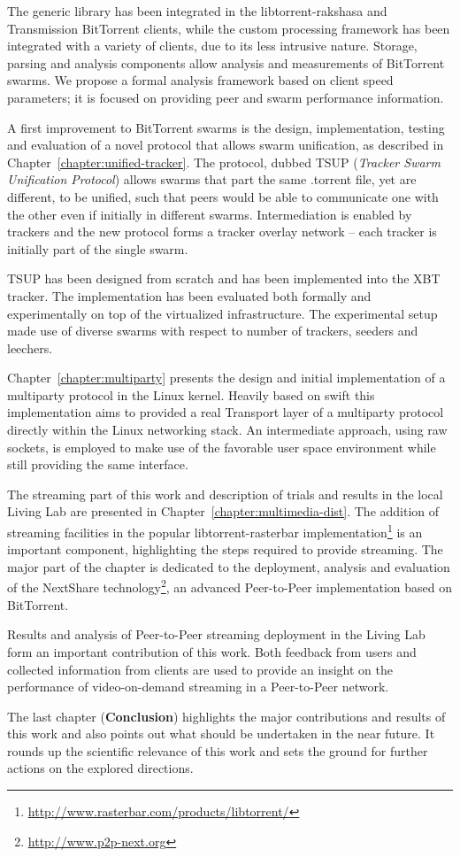 The generic library has been integrated in the libtorrent-rakshasa and
Transmission BitTorrent clients, while the custom processing framework has
been integrated with a variety of clients, due to its less intrusive nature.
Storage, parsing and analysis components allow analysis and measurements of
BitTorrent swarms. We propose a formal analysis framework based on client
speed parameters; it is focused on providing peer and swarm performance
information.

A first improvement to BitTorrent swarms is the design, implementation,
testing and evaluation of a novel protocol that allows swarm unification, as
described in Chapter~\ref{chapter:unified-tracker}. The protocol, dubbed TSUP
(\textit{Tracker Swarm Unification Protocol}) allows swarms that part the same
.torrent file, yet are different, to be unified, such that peers would be able
to communicate one with the other even if initially in different swarms.
Intermediation is enabled by trackers and the new protocol forms a tracker
overlay network -- each tracker is initially part of the single swarm.

TSUP has been designed from scratch and has been implemented into the XBT
tracker. The implementation has been evaluated both formally and
experimentally on top of the virtualized infrastructure. The experimental
setup made use of diverse swarms with respect to number of trackers, seeders
and leechers.

Chapter~\ref{chapter:multiparty} presents the design and initial
implementation of a multiparty protocol in the Linux kernel. Heavily based on
swift this implementation aims to provided a real Transport layer of a
multiparty protocol directly within the Linux networking stack. An
intermediate approach, using raw sockets, is employed to make use of the
favorable user space environment while still providing the same interface.

The streaming part of this work and description of trials and results in the
local Living Lab are presented in Chapter~\ref{chapter:multimedia-dist}. The
addition of streaming facilities in the popular libtorrent-rasterbar
implementation\footnote{\url{http://www.rasterbar.com/products/libtorrent/}}
is an important component, highlighting the steps required to provide
streaming. The major part of the chapter is dedicated to the deployment,
analysis and evaluation of the NextShare
technology\footnote{\url{http://www.p2p-next.org}}, an advanced Peer-to-Peer
implementation based on BitTorrent.

Results and analysis of Peer-to-Peer streaming deployment in the Living Lab
form an important contribution of this work. Both feedback from users and
collected information from clients are used to provide an insight on the
performance of video-on-demand streaming in a Peer-to-Peer network.

The last chapter (\textbf{Conclusion}) highlights the major contributions and
results of this work and also points out what should be undertaken in the near
future. It rounds up the scientific relevance of this work and sets the ground
for further actions on the explored directions.
